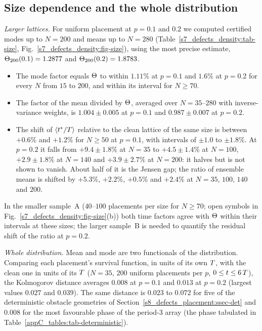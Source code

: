 \subsection{Size dependence and the whole distribution}\label{sup_defects:ssec-size}

\emph{Larger lattices.} For uniform placement at $p=0.1$ and $0.2$ we computed certified modes up to $N=200$ and
means up to $N=280$ (Table~\ref{s7_defects_density:tab-size}, Fig.~\ref{s7_defects_density:fig-size}), using
the most precise estimate, $\Theta_{200}(0.1)=1.2877$ and $\Theta_{200}(0.2)=1.8783$.
\begin{itemize}
\item The mode factor equals $\Theta$ to within $1.11\%$ at $p=0.1$ and $1.6\%$ at $p=0.2$ for every $N$ from $15$ to
$200$, and within its interval for $N\ge70$.
\item The factor of the mean divided by $\Theta$, averaged over $N=35$--$280$ with inverse-variance weights, is
$1.004\pm0.005$ at $p=0.1$ and $0.987\pm0.007$ at $p=0.2$.
\item The shift of $\langle t^{*}/T\rangle$ relative to the clean lattice of the same size is between $+0.6\%$ and
$+1.2\%$ for $N\ge50$ at $p=0.1$, with intervals of $\pm1.0$ to $\pm1.8\%$. At $p=0.2$ it falls from $+9.4\pm1.8\%$ at
$N=35$ to $+4.5\pm1.4\%$ at $N=100$, $+2.9\pm1.8\%$ at $N=140$ and $+3.9\pm2.7\%$ at $N=200$: it halves but is not
shown to vanish. About half of it is the Jensen gap; the ratio of ensemble means is shifted by $+5.3\%$, $+2.2\%$,
$+0.5\%$ and $+2.4\%$ at $N=35$, $100$, $140$ and $200$.
\end{itemize}
In the smaller sample~A ($40$--$100$ placements per size for $N\ge70$; open symbols in
Fig.~\ref{s7_defects_density:fig-size}(b)) both time factors agree with $\Theta$ within their intervals at these
sizes; the larger sample~B is needed to quantify the residual shift of the ratio at $p=0.2$.

\emph{Whole distribution.} Mean and mode are two functionals of the distribution. Comparing each placement's
survival function, in units of its own $T$, with the clean one in units of its $T$ ($N=35$, $200$ uniform
placements per $p$, $0\le t\le6\,T$), the Kolmogorov distance averages $0.008$ at $p=0.1$ and $0.013$ at $p=0.2$
(largest values $0.027$ and $0.039$). The same distance is $0.023$ to $0.072$ for five of the deterministic obstacle
geometries of Section~\ref{s8_defects_placement:ssec-det} and $0.008$ for the most favourable phase of the period-3
array (the phase tabulated in Table~\ref{appC_tables:tab-deterministic}).

